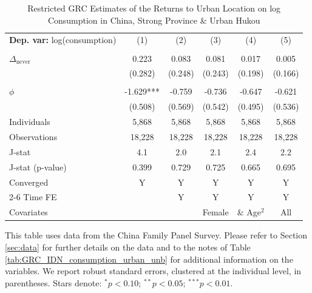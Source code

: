 \begin{table}[htbp] \centering \begin{threeparttable}
 \caption{Restricted GRC Estimates of the Returns to Urban Location on log Consumption in China, Strong Province & Urban Hukou} 
 \label{tab:GRC_CHN_s_urb_consumption_urban_unb} 
\begin{tabular}{l ccccc} \toprule  \textbf{Dep. var:}  log(consumption) 
                    &\multicolumn{1}{c}{(1)}   &\multicolumn{1}{c}{(2)}   &\multicolumn{1}{c}{(3)}   &\multicolumn{1}{c}{(4)}   &\multicolumn{1}{c}{(5)}   \\
                    &               &               &               &               &               \\
\addlinespace
$\Delta_{\text{never}}$&       0.223   &       0.083   &       0.081   &       0.017   &       0.005   \\
                    &     (0.282)   &     (0.248)   &     (0.243)   &     (0.198)   &     (0.166)   \\
                    &               &               &               &               &               \\
\addlinespace
$\phi$              &      -1.629***&      -0.759   &      -0.736   &      -0.647   &      -0.621   \\
                    &     (0.508)   &     (0.569)   &     (0.542)   &     (0.495)   &     (0.536)   \\
\addlinespace
Individuals         &       5,868   &       5,868   &       5,868   &       5,868   &       5,868   \\
Observations        &      18,228   &      18,228   &      18,228   &      18,228   &      18,228   \\
J-stat              &         4.1   &         2.0   &         2.1   &         2.4   &         2.2   \\
J-stat (p-value)    &       0.399   &       0.729   &       0.725   &       0.665   &       0.695   \\
Converged           &           Y   &           Y   &           Y   &           Y   &           Y   \\
\cmidrule{2-6} Time FE & & Y & Y & Y & Y \\ Covariates & & & Female & \& Age$^2$ & All \\ \bottomrule \end{tabular} \begin{tablenotes}[flushleft] \footnotesize \item{This table uses data from the China Family Panel Survey. Please refer to Section \ref{sec:data} for further details on the data and to the notes of Table \ref{tab:GRC_IDN_consumption_urban_unb} for additional information on the variables. We report robust standard errors, clustered at the individual level, in parentheses. Stars denote: $^{*} p<0.10$; $^{**} p<0.05$; $^{***} p<0.01$.} \end{tablenotes} \end{threeparttable} \end{table}
